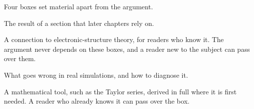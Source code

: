 Four boxes set material apart from the argument.

\begin{keyidea}
The result of a section that later chapters rely on.
\end{keyidea}

\begin{bridge}
A connection to electronic-structure theory, for readers who know it. The
argument never depends on these boxes, and a reader new to the subject can
pass over them.
\end{bridge}

\begin{practice}
What goes wrong in real simulations, and how to diagnose it.
\end{practice}

\begin{toolbox}
A mathematical tool, such as the Taylor series, derived in full where it is
first needed. A reader who already knows it can pass over the box.
\end{toolbox}
